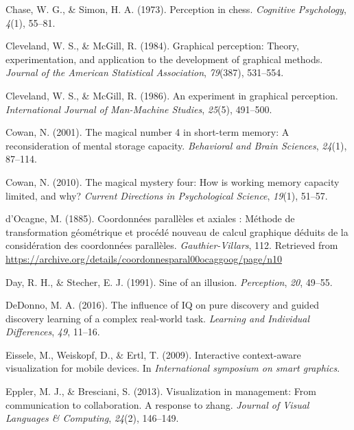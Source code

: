 \documentclass[print]{nuthesis}
\newlength{\cslhangindent}
\newenvironment{CSLReferences}[2]%
{\setlength{\parindent}{0pt}%
\everypar{\setlength{\hangindent}{\cslhangindent}}\ignorespaces}%
{\par}
\begin{document}
\begin{CSLReferences}{1}{0}
\leavevmode{}%
Chase, W. G., \& Simon, H. A. (1973). Perception in chess. \emph{Cognitive Psychology}, \emph{4}(1), 55--81.

\leavevmode{}%
Cleveland, W. S., \& McGill, R. (1984). Graphical perception: Theory, experimentation, and application to the development of graphical methods. \emph{Journal of the American Statistical Association}, \emph{79}(387), 531--554.

\leavevmode{}%
Cleveland, W. S., \& McGill, R. (1986). An experiment in graphical perception. \emph{International Journal of Man-Machine Studies}, \emph{25}(5), 491--500.

\leavevmode{}%
Cowan, N. (2001). The magical number 4 in short-term memory: A reconsideration of mental storage capacity. \emph{Behavioral and Brain Sciences}, \emph{24}(1), 87--114.

\leavevmode{}%
Cowan, N. (2010). The magical mystery four: How is working memory capacity limited, and why? \emph{Current Directions in Psychological Science}, \emph{19}(1), 51--57.

\leavevmode{}%
d'Ocagne, M. (1885). {Coordonnées parallèles et axiales : Méthode de transformation géométrique et procédé nouveau de calcul graphique déduits de la considération des coordonnées parallèles}. \emph{Gauthier-Villars}, 112. Retrieved from \url{https://archive.org/details/coordonnesparal00ocaggoog/page/n10}

\leavevmode{}%
Day, R. H., \& Stecher, E. J. (1991). Sine of an illusion. \emph{Perception}, \emph{20}, 49--55.

\leavevmode{}%
DeDonno, M. A. (2016). The influence of IQ on pure discovery and guided discovery learning of a complex real-world task. \emph{Learning and Individual Differences}, \emph{49}, 11--16.

\leavevmode{}%
Eissele, M., Weiskopf, D., \& Ertl, T. (2009). Interactive context-aware visualization for mobile devices. In \emph{International symposium on smart graphics}.

\leavevmode{}%
Eppler, M. J., \& Bresciani, S. (2013). Visualization in management: From communication to collaboration. A response to zhang. \emph{Journal of Visual Languages \& Computing}, \emph{24}(2), 146--149.


\end{CSLReferences}
\end{document}
